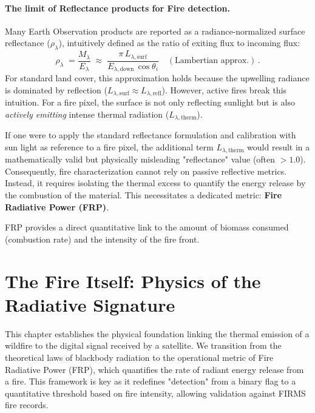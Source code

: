 \paragraph{The limit of Reflectance products for Fire detection.}
Many Earth Observation products are reported as a radiance-normalized surface reflectance ($\rho_\lambda$), intuitively defined as the ratio of exiting flux to incoming flux:
\begin{equation}
\rho_{\lambda} \;= \frac{M_\lambda}{E_\lambda} \;\approx\; \frac{\pi\,L_{\lambda,\mathrm{surf}}}{E_{\lambda,\mathrm{down}}\,\cos\theta_i}\quad (\text{Lambertian approx.})\,.
\end{equation}
For standard land cover, this approximation holds because the upwelling radiance is dominated by reflection ($L_{\lambda,\mathrm{surf}} \approx L_{\lambda,\mathrm{refl}}$). However, active fires break this intuition. For a fire pixel, the surface is not only reflecting sunlight but is also \emph{actively emitting} intense thermal radiation ($L_{\lambda,\mathrm{therm}}$). 

If one were to apply the standard reflectance formulation and calibration with sun light as reference to a fire pixel, the additional term $L_{\lambda,\mathrm{therm}}$ would result in a mathematically valid but physically misleading "reflectance" value (often $> 1.0$). Consequently, fire characterization cannot rely on passive reflective metrics. Instead, it requires isolating the thermal excess to quantify the energy release by the combustion of the material. This necessitates a dedicated metric: \textbf{Fire Radiative Power (FRP)}. 

FRP provides a direct quantitative link to the amount of biomass consumed (combustion rate) and the intensity of the fire front. 

\section{The Fire Itself: Physics of the Radiative Signature}
\label{31-the-fire-itself-physics-of-the-radiative-signature}

This chapter establishes the physical foundation linking the thermal emission of a wildfire to the digital signal received by a satellite. We transition from the theoretical laws of blackbody radiation to the operational metric of Fire Radiative Power (FRP), which quantifies the rate of radiant energy release from a fire. This framework is key as it redefines "detection" from a binary flag to a quantitative threshold based on fire intensity, allowing validation against FIRMS fire records.

